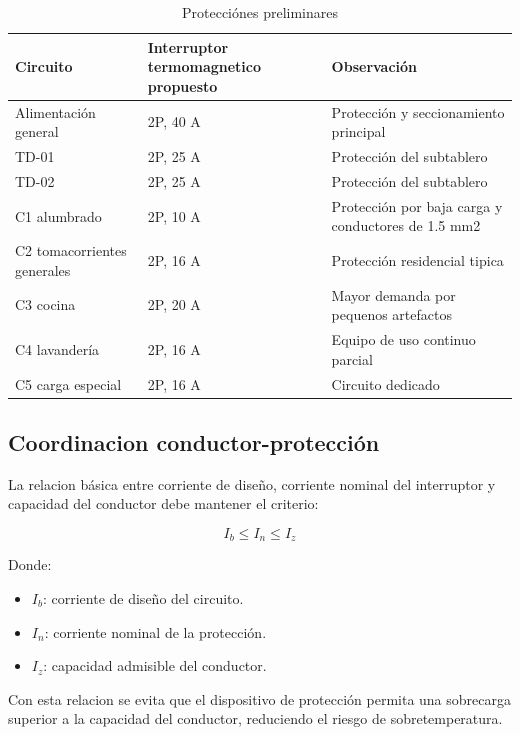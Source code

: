 \begin{landscape}
\begin{table}[H]
\centering
\small
\caption{Protecciónes preliminares}
\label{tab:protecciones-preliminares}
\begin{tabularx}{\textwidth}{L{4cm}L{5cm}Y}
\toprule
\textbf{Circuito} & \textbf{Interruptor termomagnetico propuesto} & \textbf{Observación} \\
\midrule
Alimentación general & 2P, 40 A & Protección y seccionamiento principal \\
TD-01 & 2P, 25 A & Protección del subtablero \\
TD-02 & 2P, 25 A & Protección del subtablero \\
C1 alumbrado & 2P, 10 A & Protección por baja carga y conductores de 1.5 mm2 \\
C2 tomacorrientes generales & 2P, 16 A & Protección residencial tipica \\
C3 cocina & 2P, 20 A & Mayor demanda por pequenos artefactos \\
C4 lavandería & 2P, 16 A & Equipo de uso continuo parcial \\
C5 carga especial & 2P, 16 A & Circuito dedicado \\
\bottomrule
\end{tabularx}
\end{table}
\end{landscape}

\subsection{Coordinacion conductor-protección}

La relacion básica entre corriente de diseño, corriente nominal del interruptor y capacidad del conductor debe mantener el criterio:

\begin{equation}
I_b \leq I_n \leq I_z
\end{equation}

Donde:

\begin{itemize}
  \item $I_b$: corriente de diseño del circuito.
  \item $I_n$: corriente nominal de la protección.
  \item $I_z$: capacidad admisible del conductor.
\end{itemize}

Con esta relacion se evita que el dispositivo de protección permita una sobrecarga superior a la capacidad del conductor, reduciendo el riesgo de sobretemperatura.

